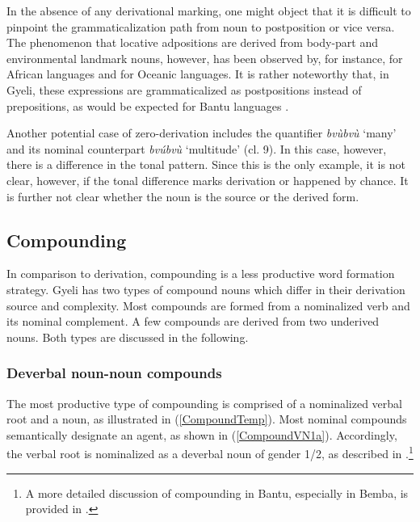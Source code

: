 In the absence of any derivational marking, one might object that it is difficult to pinpoint the grammaticalization path from noun to postposition or vice versa. The phenomenon that locative adpositions are derived from body-part and environmental landmark nouns, however, has been observed by, for instance, \citet[215]{kiessling2008} for African languages and \citet{bowden1992} for Oceanic languages. It is rather noteworthy that, in Gyeli, these expressions are grammaticalized as postpositions instead of prepositions, as would be expected for Bantu languages \citep{dryer2013b}.

Another potential case of zero-derivation includes the quantifier {\itshape bvùbvù} `many' and its nominal counterpart {\itshape bvúbvù} `multitude' (cl. 9). In this case, however, there is a difference in the tonal pattern. Since this is the only example, it is not clear, however, if the tonal difference marks derivation or happened by chance. It is further not clear whether the noun is the source or the derived form. 









\subsection{Compounding}
\label{sec:Compound}

In comparison to derivation, compounding is a less productive word formation strategy.
Gyeli has two types of compound nouns which differ in their derivation source and complexity. Most compounds are formed from a nominalized verb and its nominal complement. A few compounds are derived from two underived nouns. Both types are discussed in the following.

\subsubsection{Deverbal noun-noun compounds}
\label{sec:VNCompound}


The most productive type of compounding is comprised of a nominalized verbal root and a noun, as illustrated in (\ref{CompoundTemp}). Most nominal compounds semantically designate an agent, as shown in (\ref{CompoundVN1a}). Accordingly, the verbal root is nominalized as a deverbal noun of gender 1/2, as described in .\footnote{A more detailed discussion of compounding in Bantu, especially in Bemba, is provided in \citet{basciano2011}.}

